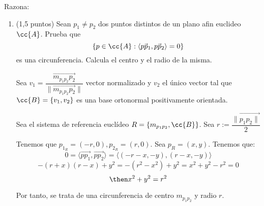 \documentclass[12pt]{article}
\begin{document}
    \begin{ejercicio}[3 puntos]
        Razona:
        
        \begin{enumerate}
        \item (1,5 puntos) Sean \( p_1\neq p_2 \) dos puntos distintos de un plano afin euclideo \( \cc{A} \).
        Prueba que 
        \[
        \{ p \in \cc{A} : \langle \vec{p p_1}, \vec{p p_2} \rangle = 0 \}
        \]
        es una circunferencia. Calcula el centro y el radio de la misma.

        \noindent

        Sea $v_1=\dfrac{\vec{m_{p_1p_2}p_2}}{\|\vec{m_{p_1p_2}p_2}\|}$ vector normalizado y $v_2$ el único vector tal que $\cc{B} = \{v_1,v_2\}$ es una base ortonormal positivamente orientada. 

        \noindent
        Sea el sistema de referencia euclídeo $R=\{m_{p_1p_2},\cc{B}\}$. Sea $r:=\dfrac{\|\vec{p_1p_2\|}}{2}$

        Tenemos que $p_{1_R}=(-r,0), p_{2_R}=(r,0)$. Sea $p_R = (x,y)$. Tenemos que: 
        $$0 = \langle\vec{pp_1},\vec{pp_2}\rangle = \langle(-r-x,-y),(r-x,-y)\rangle $$
        $$ -(r+x)(r-x) + y^2 = -(r^2-x^2)+y^2 = x^2 + y^2 - r^2 = 0$$
        $$\then x^2 + y^2 = r^2$$

        Por tanto, se trata de una circunferencia de centro $m_{p_1p_2}$ y radio $r$.
        

\end{enumerate}
\end{ejercicio}
\end{document}
